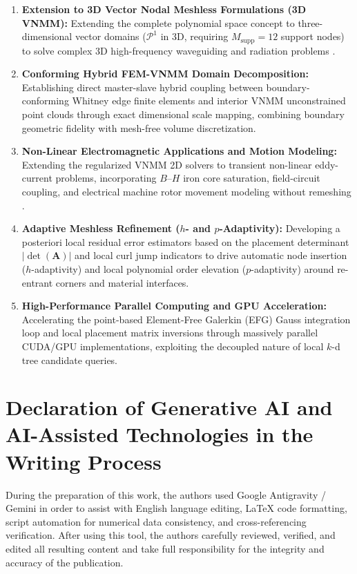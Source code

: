 \documentclass[preprint,12pt]{elsarticle}
\begin{document}
\begin{enumerate}
    \item \textbf{Extension to 3D Vector Nodal Meshless Formulations (3D VNMM):} 
    Extending the complete polynomial space concept to three-dimensional vector domains ($\mathcal{P}^1$ in 3D, requiring $M_{\mathrm{supp}} = 12$ support nodes) to solve complex 3D high-frequency waveguiding and radiation problems \cite{goncalves2023vector}.

    \item \textbf{Conforming Hybrid FEM-VNMM Domain Decomposition:} 
    Establishing direct master-slave hybrid coupling between boundary-conforming Whitney edge finite elements and interior VNMM unconstrained point clouds through exact dimensional scale mapping, combining boundary geometric fidelity with mesh-free volume discretization.

    \item \textbf{Non-Linear Electromagnetic Applications and Motion Modeling:} Extending the regularized VNMM 2D solvers to transient non-linear eddy-current problems, incorporating $B\text{--}H$ iron core saturation, field-circuit coupling, and electrical machine rotor movement modeling without remeshing \cite{tsukerman1992overlapping, coppoli2012induction}.

    \item \textbf{Adaptive Meshless Refinement ($h$- and $p$-Adaptivity):} 
    Developing a posteriori local residual error estimators based on the placement determinant $|\det(\mathbf{A})|$ and local curl jump indicators to drive automatic node insertion ($h$-adaptivity) and local polynomial order elevation ($p$-adaptivity) around re-entrant corners and material interfaces.

    \item \textbf{High-Performance Parallel Computing and GPU Acceleration:} 
    Accelerating the point-based Element-Free Galerkin (EFG) Gauss integration loop and local placement matrix inversions through massively parallel CUDA/GPU implementations, exploiting the decoupled nature of local $k$-d tree candidate queries.
\end{enumerate}


\section*{Declaration of Generative AI and AI-Assisted Technologies in the Writing Process}
During the preparation of this work, the authors used Google Antigravity / Gemini in order to assist with English language editing, LaTeX code formatting, script automation for numerical data consistency, and cross-referencing verification. After using this tool, the authors carefully reviewed, verified, and edited all resulting content and take full responsibility for the integrity and accuracy of the publication.
\end{document}
